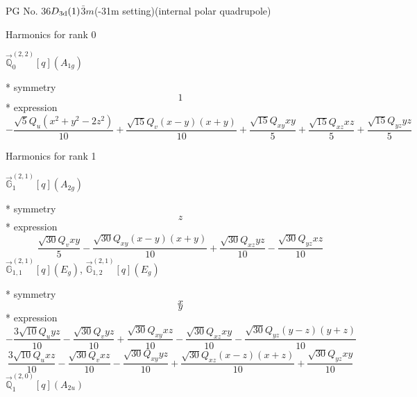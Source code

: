 \documentclass[fleqn,8pt]{jsarticle}
\begin{document}
\setcounter{MaxMatrixCols}{32}

\renewcommand{\tablename}{Table~}
\renewcommand{\figurename}{Figure~}
\begin{center}
\LARGE
PG No. 36\quad$D_{\rm 3d}(1)$\quad$\bar{3}m$\quad(-31m setting)\quad[ trigonal ] (internal polar quadrupole)
\end{center}

\noindent * Harmonics for rank 0

\noindent\quad $\vec{\mathbb{Q}}_{0}^{(2,2)}[q](A_{1g})$

\noindent\quad ** symmetry
\begin{dmath*}
1
\end{dmath*}
\noindent\quad ** expression
\begin{dmath*}
- \frac{\sqrt{5} Q_{u} \left(x^{2} + y^{2} - 2 z^{2}\right)}{10} + \frac{\sqrt{15} Q_{v} \left(x - y\right) \left(x + y\right)}{10} + \frac{\sqrt{15} Q_{xy} x y}{5} + \frac{\sqrt{15} Q_{xz} x z}{5} + \frac{\sqrt{15} Q_{yz} y z}{5}
\end{dmath*}

\noindent * Harmonics for rank 1

\noindent\quad $\vec{\mathbb{G}}_{1}^{(2,1)}[q](A_{2g})$

\noindent\quad ** symmetry
\begin{dmath*}
z
\end{dmath*}
\noindent\quad ** expression
\begin{dmath*}
\frac{\sqrt{30} Q_{v} x y}{5} - \frac{\sqrt{30} Q_{xy} \left(x - y\right) \left(x + y\right)}{10} + \frac{\sqrt{30} Q_{xz} y z}{10} - \frac{\sqrt{30} Q_{yz} x z}{10}
\end{dmath*}
\noindent\quad $\vec{\mathbb{G}}_{1,1}^{(2,1)}[q](E_{g})$, $\vec{\mathbb{G}}_{1,2}^{(2,1)}[q](E_{g})$

\noindent\quad ** symmetry
\begin{dmath*}
x
\end{dmath*}
\begin{dmath*}
y
\end{dmath*}
\noindent\quad ** expression
\begin{dmath*}
- \frac{3 \sqrt{10} Q_{u} y z}{10} - \frac{\sqrt{30} Q_{v} y z}{10} + \frac{\sqrt{30} Q_{xy} x z}{10} - \frac{\sqrt{30} Q_{xz} x y}{10} - \frac{\sqrt{30} Q_{yz} \left(y - z\right) \left(y + z\right)}{10}
\end{dmath*}
\begin{dmath*}
\frac{3 \sqrt{10} Q_{u} x z}{10} - \frac{\sqrt{30} Q_{v} x z}{10} - \frac{\sqrt{30} Q_{xy} y z}{10} + \frac{\sqrt{30} Q_{xz} \left(x - z\right) \left(x + z\right)}{10} + \frac{\sqrt{30} Q_{yz} x y}{10}
\end{dmath*}
\noindent\quad $\vec{\mathbb{Q}}_{1}^{(2,0)}[q](A_{2u})$
\end{document}
